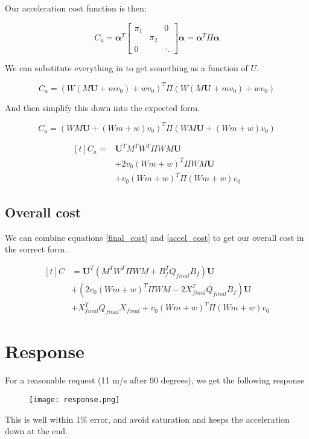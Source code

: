 \documentclass[a4paper,12pt]{article}
\begin{document}
Our acceleration cost function is then:

\begin{equation}
C_a = \boldsymbol{\alpha}^T
        \begin{bmatrix} \pi_1 &  & 0 \\
                        & \pi_2 &   \\
                        0 & & \ddots \end{bmatrix} \boldsymbol{\alpha} = 
 \boldsymbol{\alpha}^T \Pi \boldsymbol{\alpha}
\end{equation}

We can substitute everything in to get something as a function of $U$.

\begin{equation}
C_a = \left(W \left(M \boldsymbol{U} + m v_0 \right) + w v_0 \right)^T \Pi \left(W \left(M \boldsymbol{U} + m v_0 \right) + w v_0 \right)
\end{equation}

And then simplify this down into the expected form.

\begin{equation}
  C_a = \left(W M \boldsymbol{U} + (W m + w) v_0 \right)^T \Pi \left(W M \boldsymbol{U} + (W m + w) v_0  \right)
\end{equation}

\begin{equation}
\label{accel_cost}
\begin{aligned}[t]
C_a = & \boldsymbol{U}^T M^T W^T \Pi W M \boldsymbol{U} \\
  & + 2 v_0 (W m + w)^T \Pi W M \boldsymbol{U} \\
& +  v_0 (W m + w)^T  \Pi \left(W m + w \right) v_0
\end{aligned}
\end{equation}

\subsection{Overall cost}

We can combine equations \ref{final_cost} and \ref{accel_cost} to get our overall cost in the correct form.

\begin{equation}
\begin{aligned}[t]
C &= \boldsymbol{U}^T \left( M^T W^T \Pi W M + B_f^T Q_{final} B_f \right) \boldsymbol{U}  \\
 &+ \left(2 v_0 (W m + w)^T \Pi W M
   - 2 X_{final}^T Q_{final} B_f
\right) \boldsymbol{U} \\
& + X_{final}^T Q_{final} X_{final}
  +  v_0 (W m + w)^T  \Pi \left(W m + w \right) v_0
\end{aligned}
\end{equation}


\section{Response}

For a reasonable request (11 m/s after 90 degrees), we get the following response

\begin{figure}
    \centering
    \texttt{[image: response.png]}
\end{figure}

This is well within 1\% error, and avoid saturation and keeps the acceleration down at the end.
\end{document}
